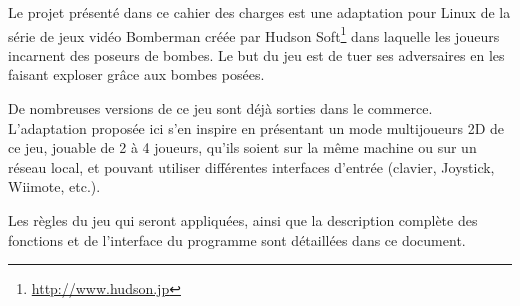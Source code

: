Le projet présenté dans ce cahier des charges est une adaptation pour Linux de la série de jeux vidéo Bomberman créée par Hudson Soft\footnote{\url{http://www.hudson.jp}} dans laquelle les joueurs incarnent des poseurs de bombes. Le but du jeu est de tuer ses adversaires en les faisant exploser grâce aux bombes posées.

\vspace{0.5cm}

De nombreuses versions de ce jeu sont déjà sorties dans le commerce. L'adaptation proposée ici s'en inspire en présentant un mode multijoueurs 2D de ce jeu, jouable de 2 à 4 joueurs, qu'ils soient sur la même machine ou sur un réseau local, et pouvant utiliser différentes interfaces d'entrée (clavier, Joystick, Wiimote, etc.).

\vspace{0.5cm}

Les règles du jeu qui seront appliquées, ainsi que la description complète des fonctions et de l'interface du programme sont détaillées dans ce document.